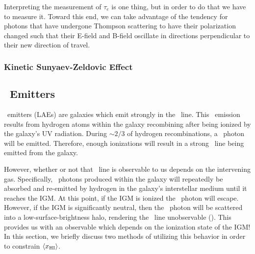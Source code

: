 Interpreting the measurement of $\tau_{e}$ is one thing, but in order to do that we have to measure it. Toward this end, we can take advantage of the tendency for photons that have undergone Thompson scattering to have their polarization changed such that their E-field and B-field oscillate in directions perpendicular to their new direction of travel. 





\subsubsection{Kinetic Sunyaev-Zeldovic Effect}



\subsection{\lya\ Emitters}

\lya\ emitters (LAEs) are galaxies which emit strongly in the \lya\ line. This \lya\ emission results from hydrogen atoms within the galaxy recombining after being ionized by the galaxy's UV radiation. During $\sim2/3$ of hydrogen recombinations, a \lya\ photon will be emitted. Therefore,  enough ionizations will result in a strong \lya\ line being emitted from the galaxy. 


However, whether or not that \lya\ line is observable to us depends on the intervening gas. Specifically, \lya\ photons produced within the galaxy will repeatedly be absorbed and re-emitted by hydrogen in the galaxy's interstellar medium until it reaches the IGM. At this point, if the IGM is ionized the \lya\ photon will escape. However, if the IGM is significantly neutral, then the \lya\ photon will be scattered into a low-surface-brightness halo, rendering the \lya\ line unobservable (\citealt{finlator2012recent}). This provides us with an observable which depends on the ionization state of the IGM! In this section, we briefly discuss two methods of utilizing this behavior in order to constrain $\langle x_{\text{HI}}\rangle$.


